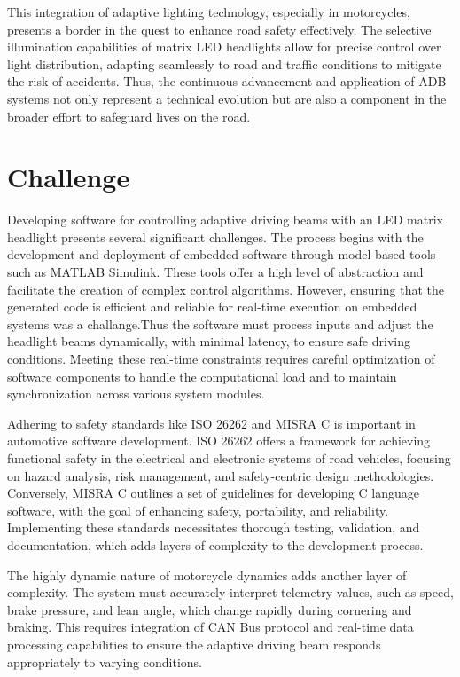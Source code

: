 This integration of adaptive lighting technology, especially in motorcycles, presents a border in the quest to enhance road safety effectively. The selective illumination capabilities of matrix LED headlights allow for precise control over light distribution, adapting seamlessly to road and traffic conditions to mitigate the risk of accidents. Thus, the continuous advancement and application of ADB systems not only represent a technical evolution but are also a component in the broader effort to safeguard lives on the road.


\section{Challenge} 

Developing software for controlling adaptive driving beams with an LED matrix headlight presents several significant challenges. The process begins with the development and deployment of embedded software through model-based tools such as MATLAB Simulink. These tools offer a high level of abstraction and facilitate the creation of complex control algorithms. However, ensuring that the generated code is efficient and reliable for real-time execution on embedded systems was a challange.Thus the software must process inputs and adjust the headlight beams dynamically, with minimal latency, to ensure safe driving conditions. Meeting these real-time constraints requires careful optimization of software components to handle the computational load and to maintain synchronization across various system modules.

Adhering to safety standards like ISO 26262 and MISRA C is important in automotive software development. ISO 26262 offers a framework for achieving functional safety in the electrical and electronic systems of road vehicles, focusing on hazard analysis, risk management, and safety-centric design methodologies. \cite{ISO_26262} Conversely, MISRA C outlines a set of guidelines for developing C language software, with the goal of enhancing safety, portability, and reliability. Implementing these standards necessitates thorough testing, validation, and documentation, which adds layers of complexity to the development process.\cite{MISRA_C_}


The highly dynamic nature of motorcycle dynamics adds another layer of complexity. The system must accurately interpret telemetry values, such as speed, brake pressure, and lean angle, which change rapidly during cornering and braking. This requires integration of CAN Bus protocol and real-time data processing capabilities to ensure the adaptive driving beam responds appropriately to varying conditions.

